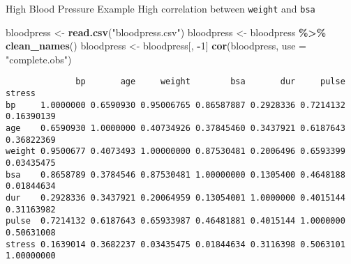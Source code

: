 \documentclass[
  ignorenonframetext,
]{beamer}
\newenvironment{Shaded}{\begin{snugshade}}{\end{snugshade}}
\newcommand{\AttributeTok}[1]{\textcolor[rgb]{0.13,0.29,0.53}{#1}}
\newcommand{\DecValTok}[1]{\textcolor[rgb]{0.00,0.00,0.81}{#1}}
\newcommand{\FunctionTok}[1]{\textcolor[rgb]{0.13,0.29,0.53}{\textbf{#1}}}
\newcommand{\NormalTok}[1]{#1}
\newcommand{\OtherTok}[1]{\textcolor[rgb]{0.56,0.35,0.01}{#1}}
\newcommand{\SpecialCharTok}[1]{\textcolor[rgb]{0.81,0.36,0.00}{\textbf{#1}}}
\newcommand{\StringTok}[1]{\textcolor[rgb]{0.31,0.60,0.02}{#1}}
\begin{document}
\begin{frame}[fragile]{High Blood Pressure Example}
\protect\hypertarget{high-blood-pressure-example-1}{}
High correlation between \texttt{weight} and \texttt{bsa}

\scriptsize

\begin{Shaded}
\begin{Highlighting}[]
\NormalTok{bloodpress }\OtherTok{\textless{}{-}} \FunctionTok{read.csv}\NormalTok{(}\StringTok{"bloodpress.csv"}\NormalTok{)}
\NormalTok{bloodpress }\OtherTok{\textless{}{-}}\NormalTok{ bloodpress }\SpecialCharTok{\%\textgreater{}\%} 
  \FunctionTok{clean\_names}\NormalTok{()}
\NormalTok{bloodpress }\OtherTok{\textless{}{-}}\NormalTok{ bloodpress[, }\SpecialCharTok{{-}}\DecValTok{1}\NormalTok{]}
\FunctionTok{cor}\NormalTok{(bloodpress, }\AttributeTok{use =} \StringTok{"complete.obs"}\NormalTok{)}
\end{Highlighting}
\end{Shaded}

\begin{verbatim}
              bp       age     weight        bsa       dur     pulse     stress
bp     1.0000000 0.6590930 0.95006765 0.86587887 0.2928336 0.7214132 0.16390139
age    0.6590930 1.0000000 0.40734926 0.37845460 0.3437921 0.6187643 0.36822369
weight 0.9500677 0.4073493 1.00000000 0.87530481 0.2006496 0.6593399 0.03435475
bsa    0.8658789 0.3784546 0.87530481 1.00000000 0.1305400 0.4648188 0.01844634
dur    0.2928336 0.3437921 0.20064959 0.13054001 1.0000000 0.4015144 0.31163982
pulse  0.7214132 0.6187643 0.65933987 0.46481881 0.4015144 1.0000000 0.50631008
stress 0.1639014 0.3682237 0.03435475 0.01844634 0.3116398 0.5063101 1.00000000
\end{verbatim}

\normalsize
\end{frame}
\end{document}

